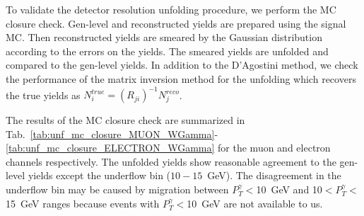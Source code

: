 To validate the detector resolution unfolding procedure, we perform the MC closure check. Gen-level and reconstructed yields are prepared using the signal MC. Then reconstructed yields are smeared by the Gaussian distribution according to the errors on the yields. The smeared yields are unfolded and compared to the gen-level yields. In addition to the D'Agostini method, we check the performance of the matrix inversion method for the unfolding which recovers the true yields as $N^{true}_i = (R_{ji})^{-1} N^{reco}_j$. 

The results of the MC closure check are summarized in Tab.~\ref{tab:unf_mc_closure_MUON_WGamma}-\ref{tab:unf_mc_closure_ELECTRON_WGamma} for the muon and electron channels respectively. The unfolded yields show reasonable agreement to the gen-level yields except the underflow bin ($10-15$~GeV). The disagreement in the underflow bin may be caused by migration between $P_T^{\gamma}<$10~GeV and 10$<P_T^{\gamma}<$15~GeV ranges because events with $P_T^{\gamma}<$10~GeV are not available to us.  



